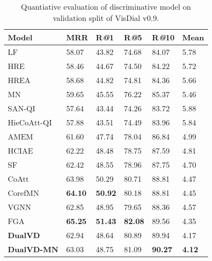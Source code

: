 \documentclass[letterpaper]{article} \usepackage{aaai20}  \usepackage{times}  \usepackage{helvet} \usepackage{courier}  \usepackage[hyphens]{url}  \usepackage{graphicx} \urlstyle{rm} \def\UrlFont{\rm}  \usepackage{graphicx}  \frenchspacing  \setlength{\pdfpagewidth}{8.5in}  \setlength{\pdfpageheight}{11in}  \usepackage{mathrsfs} \usepackage{amsfonts,amssymb}  \usepackage{tabularx} \usepackage{url}
\begin{document}
\iffalse
\begin{table}[t]
\caption{Quantiative evaluation of discriminative model on validation split of VisDial v0.9.}
\label{v9}
\begin{tabular}{L{2.42cm}C{0.68cm}C{0.68cm}C{0.68cm}C{0.8cm}C{0.68cm}}\hline                       
Model & MRR & R\textsl{@}1 & R\textsl{@}5 & R\textsl{@}10 & Mean \\
\hline  
LF &58.07&43.82&74.68&84.07&5.78  \\
HRE &58.46 &44.67&74.50&84.22&5.72\\  
HREA &58.68&44.82&74.81&84.36&5.66 \\  
MN & 59.65 & 45.55 & 76.22&85.37& 5.46 \\ 
SAN-QI &57.64&43.44&74.26&83.72&5.88\\
HieCoAtt-QI &57.88&43.51&74.49&83.96&5.84\\
AMEM &61.60&47.74&78.04&86.84&4.99\\
HCIAE &62.22&48.48&78.75&87.59&4.81\\
SF &62.42&48.55&78.96&87.75&4.70\\
CoAtt &63.98&50.29&80.71&88.81&4.47\\
CorefMN &\textbf{64.10}&\textbf{50.92}&80.18&88.81&4.45\\
VGNN &62.85&48.95&79.65&88.36&4.57\\
FGA\cite{schwartz2019factor} & \textbf{65.25} & \textbf{51.43} & \textbf{82.08} & 89.56 & 4.35 \\
\hline
\textbf{DualVD}  & 62.94 & 48.64 & 80.89 & 89.94 & 4.17 \\
\textbf{DualVD-MN}  & 63.03 & 48.75 & 81.09 & \textbf{90.27} & \textbf{4.12} \\
\hline  
\end{tabular}  
\end{table}  
\end{document}

